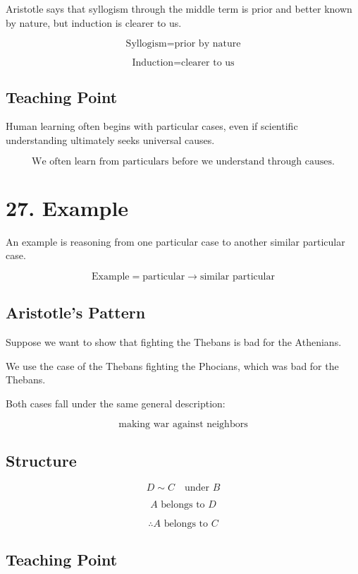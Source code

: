 \documentclass[12pt]{article}
\begin{document}
Aristotle says that syllogism through the middle term is prior and better known
by nature, but induction is clearer to us.

\[
\text{Syllogism} = \text{prior by nature}
\]

\[
\text{Induction} = \text{clearer to us}
\]

\subsection*{Teaching Point}

Human learning often begins with particular cases, even if scientific
understanding ultimately seeks universal causes.

\[
\boxed{
\text{We often learn from particulars before we understand through causes.}
}
\]

\section*{27. Example}

An example is reasoning from one particular case to another similar particular
case.

\[
\boxed{
\text{Example} = \text{particular} \rightarrow \text{similar particular}
}
\]

\subsection*{Aristotle's Pattern}

Suppose we want to show that fighting the Thebans is bad for the Athenians.

We use the case of the Thebans fighting the Phocians, which was bad for the
Thebans.

Both cases fall under the same general description:

\[
\text{making war against neighbors}
\]

\subsection*{Structure}

\[
D \sim C \quad \text{under } B
\]

\[
A \text{ belongs to } D
\]

\[
\therefore A \text{ belongs to } C
\]

\subsection*{Teaching Point}
\end{document}
